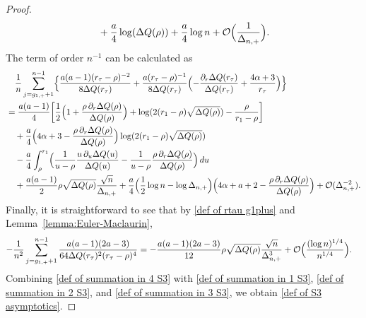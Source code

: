 \documentclass[reqno]{amsart}
\newcommand{\1}{\mathds{1}}
\numberwithin{equation}{section}
\theoremstyle{definition}
\begin{document}
\begin{proof}
\begin{align}
\begin{split}
&\quad
+\frac{a}{4}\log(\Delta Q(\rho))
+\frac{a}{4}\log n
+
\mathcal{O}\Bigl( 
\frac{1}{\Delta_{n,+}}
\Bigr). 
\end{split}
\end{align}
The term of order $n^{-1}$ can be calculated as
\begin{align}
\begin{split}
\label{def of summation in 2 S3}
&\quad
\frac{1}{n}
\sum_{j=g_{1,+}+1}^{n-1}
\Bigl\{ 
\frac{a(a-1)(r_{\tau}-\rho)^{-2}}{8\Delta Q(r_{\tau})}
+\frac{a(r_{\tau}-\rho)^{-1}}{8\Delta Q(r_{\tau})}
\Bigl(-\frac{\partial_r\Delta Q(r_{\tau})}{\Delta Q(r_{\tau})}
+\frac{4\alpha+3}{r_{\tau}}
\Bigr)
\Bigr\}
\\
&=
\frac{a(a-1)}{4}\bigg[\frac{1}{2}\Bigl(1+\frac{\rho\,\partial_r\Delta Q(\rho)}{\Delta Q(\rho)}\Bigr)+\log(2(r_1-\rho)\sqrt{\Delta Q(\rho)})-\frac{\rho}{r_1-\rho}\bigg]
\\
&\quad
+\frac{a}{4}\Bigl(4\alpha+3-\frac{\rho\,\partial_r\Delta Q(\rho)}{\Delta Q(\rho)}\Bigr)\log(2(r_1-\rho)\sqrt{\Delta Q(\rho)})
\\
&\quad
-\frac{a}{4}\int_{\rho}^{r_1}\Bigl(\frac{1}{u-\rho}\frac{u\,\partial_u\Delta Q(u)}{\Delta Q(u)}-\frac{1}{u-\rho}\frac{\rho\,\partial_r\Delta Q(\rho)}{\Delta Q(\rho)}\Bigr)\,du
\\
&\quad
+\frac{a(a-1)}{2}\rho\sqrt{\Delta Q(\rho)}\frac{\sqrt{n}}{\Delta_{n,+}}
+\frac{a}{4}\Bigl(\frac{1}{2}\log n-\log\Delta_{n,+}\Bigr)\Bigl(4\alpha+a+2-\frac{\rho\,\partial_r\Delta Q(\rho)}{\Delta Q(\rho)}\Bigr)+\mathcal{O}(\Delta_{n,+}^{-2}). 
\end{split}
\end{align}
Finally, it is straightforward to see that by \eqref{def of rtau g1plus} and Lemma~\ref{lemma:Euler-Maclaurin}, 
\begin{align}
\label{def of summation in 3 S3}
-\frac{1}{n^2}
\sum_{j=g_{1,+}+1}^{n-1}
\frac{a(a-1)(2a-3)}{64\Delta Q(r_{\tau})^2(r_{\tau}-\rho)^4}
&=
-\frac{a(a-1)(2a-3)}{12}\rho\sqrt{\Delta Q(\rho)}\frac{\sqrt{n}}{\Delta_{n,+}^3}
+\mathcal{O}\Bigl(\frac{(\log n)^{1/4}}{n^{1/4}}\Bigr). 
\end{align}
Combining \eqref{def of summation in 4 S3} with \eqref{def of summation in 1 S3}, \eqref{def of summation in 2 S3}, and \eqref{def of summation in 3 S3}, we obtain \eqref{def of S3 asymptotics}.
\end{proof}
\end{document}
